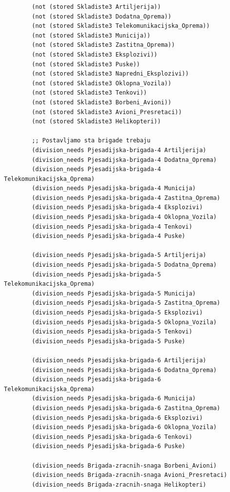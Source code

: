 \documentclass{article}
\begin{document}
\begin{verbatim}
        (not (stored Skladiste3 Artiljerija))
        (not (stored Skladiste3 Dodatna_Oprema))
        (not (stored Skladiste3 Telekomunikacijska_Oprema))
        (not (stored Skladiste3 Municija))
        (not (stored Skladiste3 Zastitna_Oprema))
        (not (stored Skladiste3 Eksplozivi))
        (not (stored Skladiste3 Puske))
        (not (stored Skladiste3 Napredni_Eksplozivi))
        (not (stored Skladiste3 Oklopna_Vozila))
        (not (stored Skladiste3 Tenkovi))
        (not (stored Skladiste3 Borbeni_Avioni))
        (not (stored Skladiste3 Avioni_Presretaci))
        (not (stored Skladiste3 Helikopteri))

        ;; Postavljamo sta brigade trebaju
        (division_needs Pjesadijska-brigada-4 Artiljerija)
        (division_needs Pjesadijska-brigada-4 Dodatna_Oprema)
        (division_needs Pjesadijska-brigada-4 Telekomunikacijska_Oprema)
        (division_needs Pjesadijska-brigada-4 Municija)
        (division_needs Pjesadijska-brigada-4 Zastitna_Oprema)
        (division_needs Pjesadijska-brigada-4 Eksplozivi)
        (division_needs Pjesadijska-brigada-4 Oklopna_Vozila)
        (division_needs Pjesadijska-brigada-4 Tenkovi)
        (division_needs Pjesadijska-brigada-4 Puske)
        
        (division_needs Pjesadijska-brigada-5 Artiljerija)
        (division_needs Pjesadijska-brigada-5 Dodatna_Oprema)
        (division_needs Pjesadijska-brigada-5 Telekomunikacijska_Oprema)
        (division_needs Pjesadijska-brigada-5 Municija)
        (division_needs Pjesadijska-brigada-5 Zastitna_Oprema)
        (division_needs Pjesadijska-brigada-5 Eksplozivi)
        (division_needs Pjesadijska-brigada-5 Oklopna_Vozila)
        (division_needs Pjesadijska-brigada-5 Tenkovi)
        (division_needs Pjesadijska-brigada-5 Puske)
        
        (division_needs Pjesadijska-brigada-6 Artiljerija)
        (division_needs Pjesadijska-brigada-6 Dodatna_Oprema)
        (division_needs Pjesadijska-brigada-6 Telekomunikacijska_Oprema)
        (division_needs Pjesadijska-brigada-6 Municija)
        (division_needs Pjesadijska-brigada-6 Zastitna_Oprema)
        (division_needs Pjesadijska-brigada-6 Eksplozivi)
        (division_needs Pjesadijska-brigada-6 Oklopna_Vozila)
        (division_needs Pjesadijska-brigada-6 Tenkovi)
        (division_needs Pjesadijska-brigada-6 Puske)
        
        (division_needs Brigada-zracnih-snaga Borbeni_Avioni)
        (division_needs Brigada-zracnih-snaga Avioni_Presretaci)
        (division_needs Brigada-zracnih-snaga Helikopteri)
        

\end{verbatim}
\end{document}
